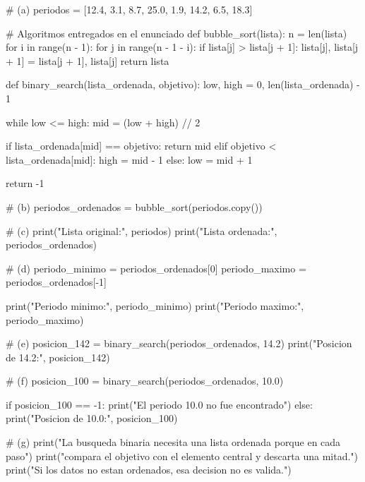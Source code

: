 \begin{solution}
\begin{pythonjupyter}
# (a)
periodos = [12.4, 3.1, 8.7, 25.0, 1.9, 14.2, 6.5, 18.3]

# Algoritmos entregados en el enunciado
def bubble_sort(lista):
    n = len(lista)
    for i in range(n - 1):
        for j in range(n - 1 - i):
            if lista[j] > lista[j + 1]:
                lista[j], lista[j + 1] = lista[j + 1], lista[j]
    return lista

def binary_search(lista_ordenada, objetivo):
    low, high = 0, len(lista_ordenada) - 1

    while low <= high:
        mid = (low + high) // 2

        if lista_ordenada[mid] == objetivo:
            return mid
        elif objetivo < lista_ordenada[mid]:
            high = mid - 1
        else:
            low = mid + 1

    return -1

# (b)
periodos_ordenados = bubble_sort(periodos.copy())

# (c)
print("Lista original:", periodos)
print("Lista ordenada:", periodos_ordenados)

# (d)
periodo_minimo = periodos_ordenados[0]
periodo_maximo = periodos_ordenados[-1]

print("Periodo minimo:", periodo_minimo)
print("Periodo maximo:", periodo_maximo)

# (e)
posicion_142 = binary_search(periodos_ordenados, 14.2)
print("Posicion de 14.2:", posicion_142)

# (f)
posicion_100 = binary_search(periodos_ordenados, 10.0)

if posicion_100 == -1:
    print("El periodo 10.0 no fue encontrado")
else:
    print("Posicion de 10.0:", posicion_100)

# (g)
print("La busqueda binaria necesita una lista ordenada porque en cada paso")
print("compara el objetivo con el elemento central y descarta una mitad.")
print("Si los datos no estan ordenados, esa decision no es valida.")
\end{pythonjupyter}
\end{solution}

